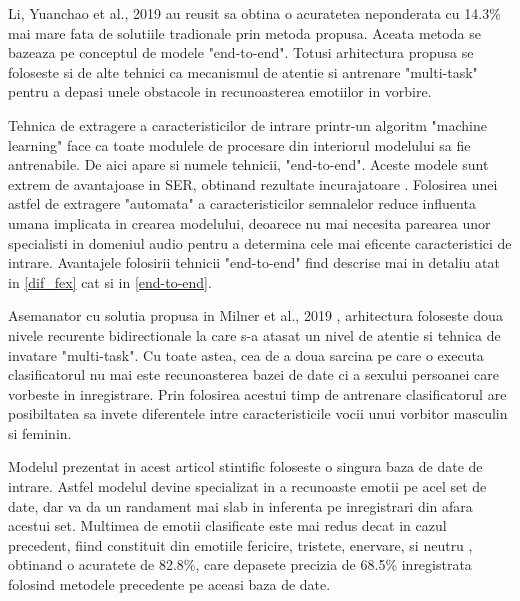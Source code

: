 \documentclass[a4paper,12pt]{book}
\begin{document}
					Li, Yuanchao et al., 2019 \cite{yuan} au reusit sa obtina o acuratetea neponderata cu 14.3\% mai mare fata de solutiile tradionale prin metoda propusa. Aceata metoda se bazeaza pe conceptul de modele "end-to-end". Totusi arhitectura propusa se foloseste si de alte tehnici ca mecanismul de atentie si antrenare "multi-task" pentru a depasi unele obstacole in recunoasterea emotiilor in vorbire. \par
					
					Tehnica de extragere a caracteristicilor de intrare printr-un algoritm "machine learning" face ca toate modulele de procesare din interiorul modelului sa fie antrenabile. De aici apare si numele tehnicii, "end-to-end". Aceste modele sunt extrem de avantajoase in SER, obtinand rezultate incurajatoare \cite{adieu,e2e}. Folosirea unei astfel de extragere "automata" a caracteristicilor semnalelor reduce influenta umana implicata in crearea modelului, deoarece nu mai necesita parearea unor specialisti in domeniul audio pentru a determina cele mai eficente caracteristici de intrare. Avantajele folosirii tehnicii "end-to-end" find descrise mai in detaliu atat in \ref{dif_fex} cat si in \ref{end-to-end}. \par
					
					Asemanator cu solutia propusa in Milner et al., 2019 \cite{multi-domain}, arhitectura foloseste doua nivele recurente bidirectionale la care s-a atasat un nivel de atentie si tehnica de  invatare "multi-task". Cu toate astea, cea de a doua sarcina pe care o executa clasificatorul nu mai este recunoasterea bazei de date ci a sexului persoanei care vorbeste in inregistrare. Prin folosirea acestui timp de antrenare clasificatorul are posibiltatea sa invete diferentele intre caracteristicile vocii unui vorbitor masculin si feminin. \par
					
					Modelul prezentat in acest articol stintific foloseste o singura baza de date de intrare. Astfel modelul devine specializat in a recunoaste emotii pe acel set de date, dar va da un randament mai slab in inferenta pe inregistrari din afara acestui set. Multimea de emotii clasificate este mai redus decat in cazul precedent, fiind constituit din emotiile fericire, tristete, enervare, si neutru , obtinand o acuratete de 82.8\%, care depasete precizia de 68.5\% inregistrata folosind metodele precedente pe aceasi baza de date.
\end{document}
